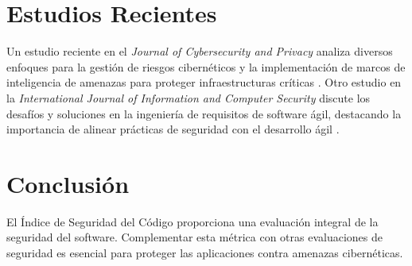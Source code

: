 \documentclass{article}
\begin{document}
\section{Estudios Recientes}
Un estudio reciente en el \textit{Journal of Cybersecurity and Privacy} analiza diversos enfoques para la gestión de riesgos cibernéticos y la implementación de marcos de inteligencia de amenazas para proteger infraestructuras críticas \citep{mdpi2023}. Otro estudio en la \textit{International Journal of Information and Computer Security} discute los desafíos y soluciones en la ingeniería de requisitos de software ágil, destacando la importancia de alinear prácticas de seguridad con el desarrollo ágil \citep{inderscience2023}.

\section{Conclusión}
El Índice de Seguridad del Código proporciona una evaluación integral de la seguridad del software. Complementar esta métrica con otras evaluaciones de seguridad es esencial para proteger las aplicaciones contra amenazas cibernéticas.



\end{document}
